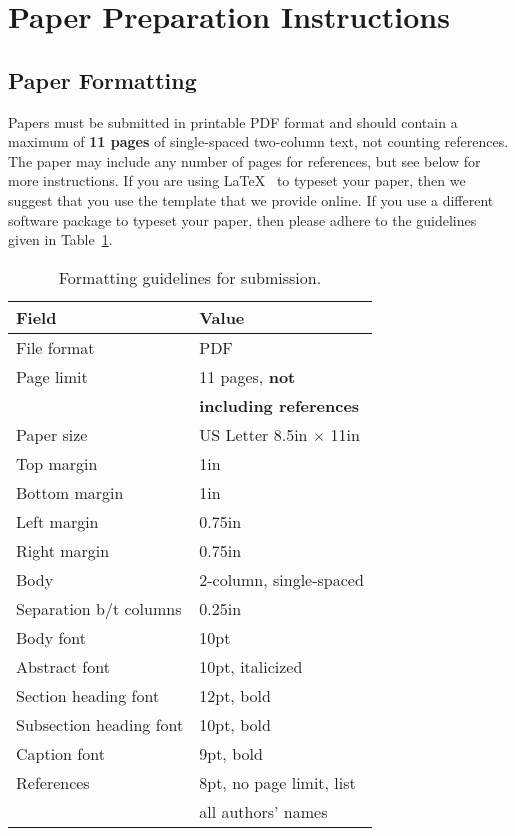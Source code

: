 \documentclass[pageno]{jpaper}
\begin{document}
\section{Paper Preparation Instructions}

\subsection{Paper Formatting}

Papers must be submitted in printable PDF format and should contain a
maximum of {\bf 11 pages} of single-spaced two-column text, not counting
references. The paper may include any number of pages for
references, but see below for more instructions. If you are using
\LaTeX~\cite{lamport94} to typeset your paper, then we suggest that
you use the template that we provide online.
If you use a different
software package to typeset your paper, then please adhere to the
guidelines given in Table~\ref{table:formatting}.

\begin{table}[h!]
  \centering
  \begin{tabular}{|l|l|}
    \hline
    \textbf{Field} & \textbf{Value}\\
    \hline
    \hline
    File format & PDF \\
    \hline
    Page limit & 11 pages, {\bf not }\\
               & {\bf including references}\\
    \hline
    Paper size & US Letter 8.5in $\times$ 11in\\
    \hline
    Top margin & 1in\\
    \hline
    Bottom margin & 1in\\
    \hline
    Left margin & 0.75in\\
    \hline
    Right margin & 0.75in\\
    \hline
    Body & 2-column, single-spaced\\
    \hline
    Separation b/t columns & 0.25in\\
    \hline
    Body font & 10pt\\
    \hline
    Abstract font & 10pt, italicized\\
    \hline
    Section heading font & 12pt, bold\\
    \hline
    Subsection heading font & 10pt, bold\\
    \hline
    Caption font & 9pt, bold\\
    \hline
    References & 8pt, no page limit, list \\
               & all authors' names\\
    \hline
  \end{tabular}
  \caption{Formatting guidelines for submission. }
  \label{table:formatting}
\end{table}
\end{document}
